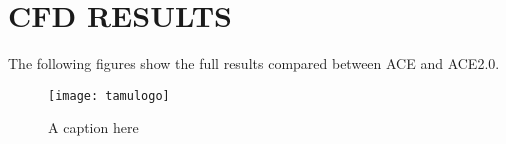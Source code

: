 %
%	 
%



\chapter{CFD RESULTS}

The following figures show the full results compared between ACE and ACE2.0.

\begin{figure}[ht]
    \centering
    \texttt{[image: tamulogo]}
    \caption{A caption here}
\end{figure}


